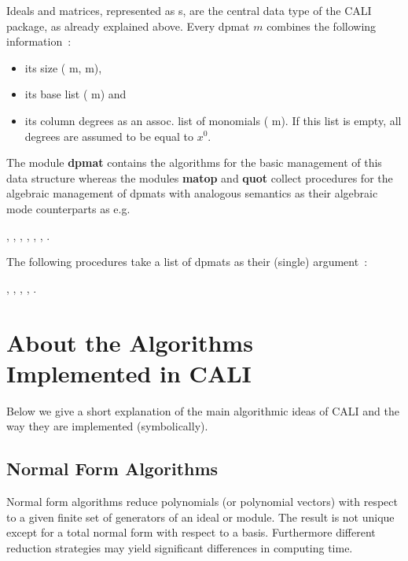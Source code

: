 Ideals and matrices, represented as s, are the central
data type of the CALI package, as already explained above. Every
dpmat $m$ combines the following information~:
\begin{itemize}
\item its size ( m, m),

\item its base list ( m) and

\item its column degrees as an assoc. list of monomials
( m). If this list is empty, all degrees are
assumed to be equal to $x^0$.
\end{itemize}

The module {\bf dpmat} contains the algorithms for the basic
management of this data structure whereas the modules {\bf matop} and
{\bf quot} collect procedures for the algebraic management of dpmats
with analogous semantics as their algebraic mode counterparts as e.g.
\begin{center}
\parbox{14cm}
{, , ,
, , ,
.}
\end{center}
The following procedures take a list of dpmats as their (single)
argument~: 
\begin{center}
\parbox{14cm}
{, , ,
, .}
\end{center}


\section{About the Algorithms Implemented in CALI}

Below we give a short explanation of the main algorithmic ideas of
CALI and the way they are implemented (symbolically).

\subsection{Normal Form Algorithms}

Normal form algorithms reduce polynomials (or polynomial vectors)
with respect to a given finite set of generators of an ideal or
module. The result is not unique except for a total normal form with
respect to a \gr basis. Furthermore different reduction strategies
may yield significant differences in computing time.

